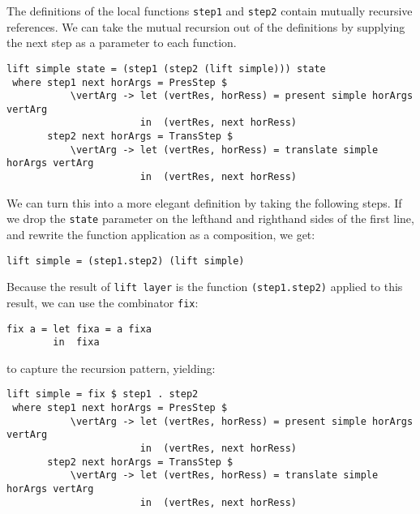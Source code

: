 The definitions of the local functions \texttt{step1} and \texttt{step2} contain mutually recursive references. We can take the mutual recursion out of the definitions by supplying the next step as a parameter to each function. 

\begin{small}
\begin{verbatim}
lift simple state = (step1 (step2 (lift simple))) state 
 where step1 next horArgs = PresStep $ 
           \vertArg -> let (vertRes, horRess) = present simple horArgs vertArg                                         
                       in  (vertRes, next horRess)
       step2 next horArgs = TransStep $
           \vertArg -> let (vertRes, horRess) = translate simple horArgs vertArg                     
                       in  (vertRes, next horRess)
\end{verbatim}
\end{small}

We can turn this into a more elegant definition by taking the following steps. If we drop the \texttt{state} parameter on the lefthand and righthand sides of the first line, and rewrite the function application as a composition, we get:

\begin{small}
\begin{verbatim}
lift simple = (step1.step2) (lift simple)
\end{verbatim}
\end{small}

Because the result of \texttt{lift layer} is the function \texttt{(step1.step2)} applied to this result, we can use the combinator \texttt{fix}:

\begin{small}
\begin{verbatim}
fix a = let fixa = a fixa
        in  fixa
\end{verbatim}
\end{small}

to capture the recursion pattern, yielding:

\begin{small}
\begin{verbatim}
lift simple = fix $ step1 . step2 
 where step1 next horArgs = PresStep $ 
           \vertArg -> let (vertRes, horRess) = present simple horArgs vertArg                                         
                       in  (vertRes, next horRess)
       step2 next horArgs = TransStep $
           \vertArg -> let (vertRes, horRess) = translate simple horArgs vertArg                     
                       in  (vertRes, next horRess)
\end{verbatim}
\end{small}

